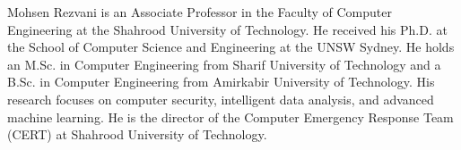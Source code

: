 \documentclass[10pt,journal,compsoc]{IEEEtran}
\begin{document}
\begin{IEEEbiographynophoto}{ Mohsen Rezvani}
is an Associate Professor in the Faculty of Computer Engineering at the Shahrood University of Technology. He received his Ph.D. at the School of Computer Science and Engineering at the UNSW Sydney. He holds an M.Sc. in Computer Engineering from Sharif University of Technology and a B.Sc. in Computer Engineering from Amirkabir University of Technology. His research focuses on computer security, intelligent data analysis, and advanced machine learning. He is the director of the Computer Emergency Response Team (CERT) at Shahrood University of Technology.
\end{IEEEbiographynophoto}
\end{document}
